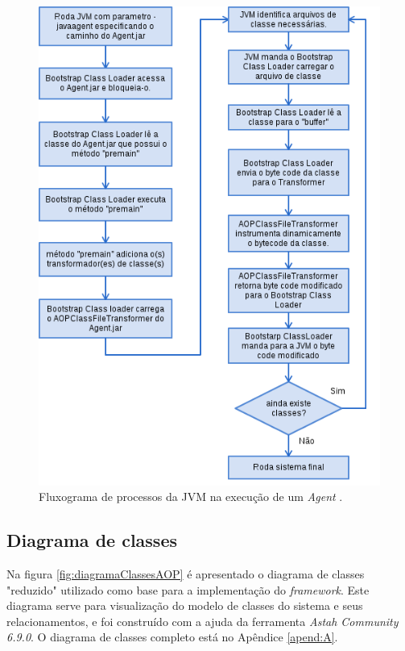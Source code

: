 \documentclass[tc,oneside]{iiufrgs}
\begin{document}
\begin{figure}[ht]
	\centering
	\includegraphics[scale=0.6]{diagramas/fluxograma_Agent.png}
	\caption{Fluxograma de processos da JVM na execução de um \textit{Agent} \cite{stark2001java}.}
	\label{fig:fluxogramaAgent}
\end{figure}

\subsection{Diagrama de classes}

Na figura \ref{fig:diagramaClassesAOP} é apresentado o diagrama de classes "reduzido" utilizado como base para a implementação do \textit{framework}. Este diagrama serve para visualização do modelo de classes do sistema e seus relacionamentos, e foi construído com a ajuda da ferramenta \textit{Astah Community 6.9.0}. O diagrama de classes completo está no Apêndice \ref{apend:A}.
\end{document}
